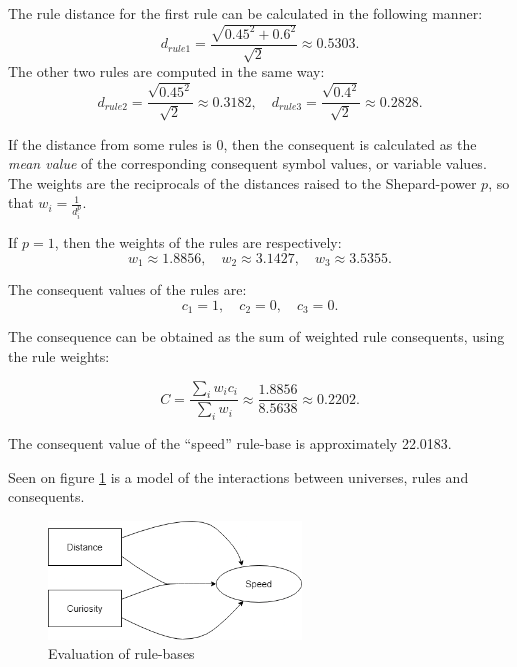 The rule distance for the first rule can be calculated in the following manner:
\[
	d_{rule1} = \frac{\sqrt{0.45^2 + 0.6^2}}{\sqrt{2}} \approx 0.5303.
\]
\noindent The other two rules are computed in the same way:
\[
	d_{rule2} = \frac{\sqrt{0.45^2}}{\sqrt{2}} \approx 0.3182, \quad
	d_{rule3} = \frac{\sqrt{0.4^2}}{\sqrt{2}} \approx 0.2828.
\]

If the distance from some rules is 0, then the consequent is calculated as the \textit{mean value} of the corresponding consequent symbol values, or variable values. The weights are the reciprocals of the distances raised to the Shepard-power $p$, so that $w_i = \frac{1}{d^p_i}$.

\noindent If $p = 1$, then the weights of the rules are respectively:
 \[
 	w_1 \approx 1.8856, \quad w_2 \approx  3.1427, \quad w_3 \approx  3.5355.
 \]

\noindent The consequent values of the rules are:
\[
	c_1 = 1,\quad c_2 = 0,\quad c_3 = 0.
\]

\noindent The consequence can be obtained as the sum of weighted rule consequents, using the rule weights:

\[
	C = \frac{\sum_i w_i  c_i}{\sum_i w_i} \approx \frac{1.8856}{8.5638} \approx 0.2202.
\]

\noindent The consequent value of the “speed” rule-base is approximately 22.0183. 

Seen on figure \ref{fig:example} is a model of the interactions between universes, rules and consequents.
\begin{figure}[!h]
	\centering
	\includegraphics[width=0.6\textwidth]{images/example}
	\caption{Evaluation of rule-bases}
	\label{fig:example}
\end{figure}

